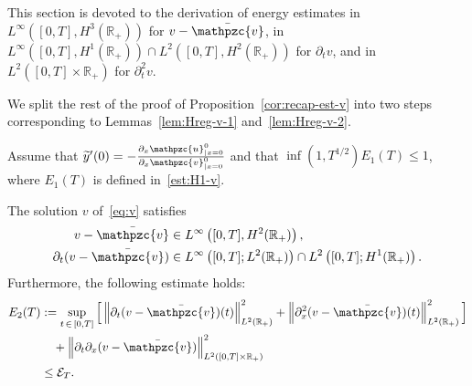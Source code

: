 \documentclass[AHL,Unicode,longabstracts,published]{cedram}
\newcommand{\R}{\mathbb{R}}
\newcommand{\p}{\partial}
\newcommand{\bv}{\bar{\mathpzc{v}}}
\newcommand{\cE}{\mathcal E}
\newcommand{\tv}{\mathpzc{v}}
\newcommand{\tu}{\mathpzc{u}}
\newcommand{\ty}{\widetilde{y}}
\begin{document}
This section is devoted to the derivation of energy estimates in $L^\infty([0,T], H^3(\R_+))$ for $v-\bv$, in $L^\infty([0,T], H^1(\R_+))\cap L^2([0,T], H^2(\R_+))$ for $\p_t v$, and in $L^2([0,T]\times \R_+)$ for $\p_t^2 v$.



We split the rest of the proof of Proposition~\ref{cor:recap-est-v} into two steps corresponding to Lemmas~\ref{lem:Hreg-v-1} and~\ref{lem:Hreg-v-2}.

\begin{lemm}\label{lem:Hreg-v-1}
Assume that $\ty'(0)= - \frac{\p_x \tu^0_{|x=0}}{\partial_x \tv^0_{|x=0}}$ and that $\inf (1,T^{1/2}) E_1(T)\leq 1$, where $E_1(T)$ is defined in~\eqref{est:H1-v}.


The solution $v$ of~\eqref{eq:v} satisfies
\begin{align*}
v -\bv &\in L^\infty\left([0,T], H^2(\R_+)\right),\\
\partial_t(v-\bv) &\in L^\infty\left([0,T];L^2(\R_+)\right) \cap L^2\left([0,T]; H^1(\R_+)\right).
\end{align*}
Furthermore, the following estimate holds:
\begin{equation}\label{est:high-reg-v-I-bis}
\begin{split}
E_2(T)&:=\sup_{t\,\in\,[0,T]} \Big[\left\|\partial_t (v-\bv)(t)\right\|_{L^2(\R_+)}^2 + \left\|\partial^{2}_x(v-\bv)(t)\right\|_{L^2(\R_+)}^2 \Big] \\
&\quad+ \left\| \partial_t \partial_x (v-\bv)\right\|_{L^2([0,T]\times\R_+)}^2 \\& \leq \cE_T.
\end{split}
\end{equation}
\end{lemm}
\end{document}
